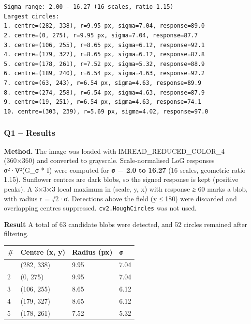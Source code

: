 \documentclass[11pt]{article}
\begin{document}
    \begin{center}
    \end{center}
    { \hspace*{\fill} \\}
    
    \begin{Verbatim}[commandchars=\\\{\}]

Sigma range: 2.00 - 16.27 (16 scales, ratio 1.15)
Largest circles:
1. centre=(282, 338), r=9.95 px, sigma=7.04, response=89.0
2. centre=(0, 275), r=9.95 px, sigma=7.04, response=87.7
3. centre=(106, 255), r=8.65 px, sigma=6.12, response=92.1
4. centre=(179, 327), r=8.65 px, sigma=6.12, response=87.8
5. centre=(178, 261), r=7.52 px, sigma=5.32, response=88.9
6. centre=(189, 240), r=6.54 px, sigma=4.63, response=92.2
7. centre=(63, 243), r=6.54 px, sigma=4.63, response=89.9
8. centre=(274, 258), r=6.54 px, sigma=4.63, response=87.9
9. centre=(19, 251), r=6.54 px, sigma=4.63, response=74.1
10. centre=(303, 239), r=5.69 px, sigma=4.02, response=97.0
    \end{Verbatim}

    \subsubsection{Q1 -- Results}\label{q1-results}

\textbf{Method.} The image was loaded with IMREAD\_REDUCED\_COLOR\_4
(360×360) and converted to grayscale. Scale-normalised LoG responses
σ²·∇²(G\_σ * I) were computed for \textbf{σ = 2.0 to 16.27} (16 scales,
geometric ratio 1.15). Sunflower centres are dark blobs, so the signed
response is kept (positive peaks). A 3×3×3 local maximum in (scale, y,
x) with response ≥ 60 marks a blob, with radius r = √2·σ. Detections
above the field (y ≤ 180) were discarded and overlapping centres
suppressed. \texttt{cv2.HoughCircles} was not used.

\textbf{Result} A total of 63 candidate blobs were detected, and 52
circles remained after filtering.

{\def\LTcaptype{none} %
\begin{longtable}[]{@{}llll@{}}
\toprule\noalign{}
\# & Centre (x, y) & Radius (px) & σ \\
\midrule\noalign{}
\endhead
\bottomrule\noalign{}
\endlastfoot
1 & (282, 338) & 9.95 & 7.04 \\
2 & (0, 275) & 9.95 & 7.04 \\
3 & (106, 255) & 8.65 & 6.12 \\
4 & (179, 327) & 8.65 & 6.12 \\
5 & (178, 261) & 7.52 & 5.32 \\
\end{longtable}
}
\end{document}
